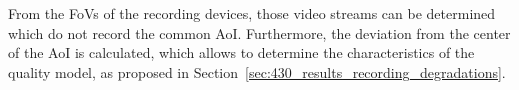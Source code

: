 From the \ac{FoV}s of the recording devices, those video streams can be determined which do not record the common \ac{AoI}.
Furthermore, the deviation from the center of the \ac{AoI} is calculated, which allows to determine the characteristics of the quality model, as proposed in Section~\ref{sec:430_results_recording_degradations}.